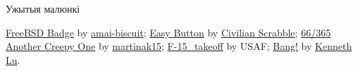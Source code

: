 \documentclass[ignorenonframetext,hyperref={pdftex,unicode}]{beamer}
\begin{document}
\frame{\questionslide}

\begin{frame}{Ужытыя малюнкі}
	\begin{thebibliography}{10}
	\beamertemplatetextbibitems
	\bibitem{}
		{\sc \href{http://amai-biscuit.deviantart.com/art/FreeBSD-Badge-345132138}{FreeBSD Badge}} by {\sc \href{http://amai-biscuit.deviantart.com/}{amai-biscuit}};
	\bibitem{}
		{\sc \href{https://www.flickr.com/photos/nmcmanus/338391435}{Easy Button}} by {\sc \href{https://www.flickr.com/photos/nmcmanus/}{Civilian Scrabble}};
	\bibitem{}
		{\sc \href{https://www.flickr.com/photos/martinaphotography/6428406857}{66/365 Another Creepy One}} by {\sc \href{https://www.flickr.com/photos/martinaphotography/}{martinak15}};
		{\sc \href{https://commons.wikimedia.org/wiki/File:F-15\_takeoff.jpg}{F-15\_takeoff}} by {\sc USAF};
	\bibitem{}
		{\sc \href{https://www.flickr.com/photos/toasty/914441359}{Bang!}} by {\sc \href{https://www.flickr.com/photos/toasty/}{Kenneth Lu}}.
	\end{thebibliography}
\end{frame}
\end{document}
